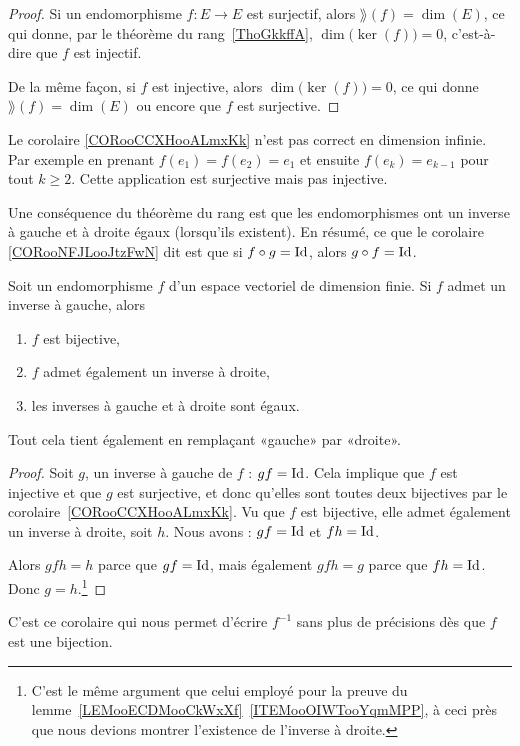 \begin{proof}
    Si un endomorphisme \( f\colon E\to E\) est surjectif, alors \( \rang(f)=\dim(E)\), ce qui donne, par le théorème du rang~\ref{ThoGkkffA}, \( \dim\big( \ker(f) \big)=0\), c'est-à-dire que \( f\) est injectif.

    De la même façon, si \( f\) est injective, alors \( \dim\big( \ker(f) \big)=0\), ce qui donne \( \rang(f)=\dim(E)\) ou encore que \( f\) est surjective.
\end{proof}

\begin{example}
    Le corolaire \ref{CORooCCXHooALmxKk} n'est pas correct en dimension infinie. Par exemple en prenant \( f(e_1)=f(e_2)=e_1\) et ensuite \( f(e_k)=e_{k-1}\) pour tout \( k\geq 2\). Cette application est surjective mais pas injective.
\end{example}

Une conséquence du théorème du rang est que les endomorphismes ont un inverse à gauche et à droite égaux (lorsqu'ils existent). En résumé, ce que le corolaire \ref{CORooNFJLooJtzFwN} dit est que si \( f\circ g = \operatorname{Id}\), alors \( g \circ f = \operatorname{Id}\).
\begin{corollary}           \label{CORooNFJLooJtzFwN}
    Soit un endomorphisme \( f\) d'un espace vectoriel de dimension finie. Si \( f\) admet un inverse à gauche, alors
    \begin{enumerate}
        \item
            \( f\) est bijective,
        \item
            \( f\) admet également un inverse à droite,
        \item
            les inverses à gauche et à droite sont égaux.
    \end{enumerate}
    Tout cela tient également en remplaçant «gauche» par «droite».
\end{corollary}

\begin{proof}
    Soit \( g\), un inverse à gauche de \( f\) : \( gf=\operatorname{Id}\). Cela implique que \( f\) est injective et que \( g\) est surjective, et donc qu'elles sont toutes deux bijectives par le corolaire~\ref{CORooCCXHooALmxKk}. Vu que \( f\) est bijective, elle admet également un inverse à droite, soit \( h\). Nous avons : \( gf=\operatorname{Id}\) et \( fh=\operatorname{Id}\).

    Alors \( gfh=h\) parce que \( gf=\operatorname{Id}\), mais également \( gfh=g\) parce que \( fh=\operatorname{Id}\). Donc \( g=h\).\footnote{C'est le même argument que celui employé pour la preuve du lemme~\ref{LEMooECDMooCkWxXf}~\ref{ITEMooOIWTooYqmMPP}, à ceci près que nous devions montrer l'existence de l'inverse à droite.}
\end{proof}
C'est ce corolaire qui nous permet d'écrire \( f^{-1}\) sans plus de précisions dès que \( f\) est une bijection.

